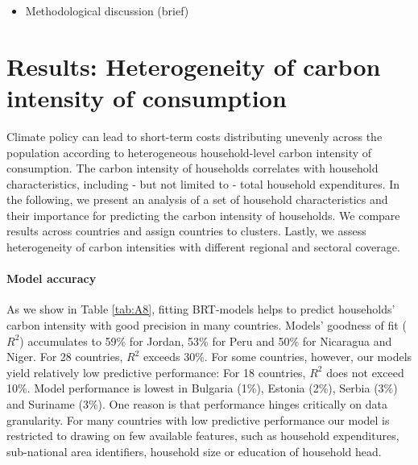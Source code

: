 \documentclass[12pt, a4paper]{article}
\begin{document}
\begin{itemize}
    \item Methodological discussion (brief)
\end{itemize}

\clearpage

\section{Results: Heterogeneity of carbon intensity of consumption} \label{sec:results}

Climate policy can lead to short-term costs distributing unevenly across the population according to heterogeneous household-level carbon intensity of consumption. The carbon intensity of households correlates with household characteristics, including - but not limited to - total household expenditures. In the following, we present an analysis of a set of household characteristics and their importance for predicting the carbon intensity of households. We compare results across countries and assign countries to clusters. Lastly, we assess heterogeneity of carbon intensities with different regional and sectoral coverage.

\paragraph{Model accuracy} As we show in Table \ref{tab:A8}, fitting BRT-models helps to predict households' carbon intensity with good precision in many countries. Models' goodness of fit ($R^{2}$) accumulates to 59\% for Jordan, 53\% for Peru and 50\% for Nicaragua and Niger. For 28 countries, $R^{2}$ exceeds 30\%. For some countries, however, our models yield relatively low predictive performance: For 18 countries, $R^{2}$ does not exceed 10\%. Model performance is lowest in Bulgaria (1\%), Estonia (2\%), Serbia (3\%) and Suriname (3\%). One reason is that performance hinges critically on data granularity. For many countries with low predictive performance our model is restricted to drawing on few available features, such as household expenditures, sub-national area identifiers, household size or education of household head.
\end{document}
